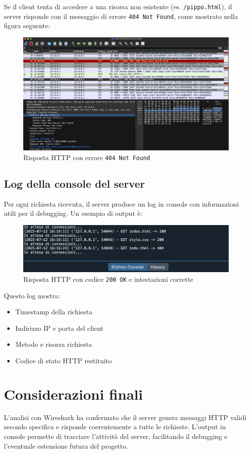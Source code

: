 \documentclass[a4paper,12pt]{report}
\begin{document}
Se il client tenta di accedere a una risorsa non esistente (es. \texttt{/pippo.html}), il server risponde con il messaggio di errore \texttt{404 Not Found}, come mostrato nella figura seguente:

\begin{figure}[H]
    \centering
    \includegraphics[width=1.0\textwidth]{Images/404NotFound.png}
    \caption{Risposta HTTP con errore \texttt{404 Not Found}}
\end{figure}

\section{Log della console del server}

Per ogni richiesta ricevuta, il server produce un log in console con informazioni utili per il debugging. Un esempio di output è:
\begin{figure}[H]
    \centering
    \includegraphics[width=1.0\textwidth]{Images/consoleLog.png}
    \caption{Risposta HTTP con codice \texttt{200 OK} e intestazioni corrette}
\end{figure}

Questo log mostra:
\begin{itemize}
    \item Timestamp della richiesta
    \item Indirizzo IP e porta del client
    \item Metodo e risorsa richiesta
    \item Codice di stato HTTP restituito
\end{itemize}

\chapter{Considerazioni finali }

L’analisi con Wireshark ha confermato che il server genera messaggi HTTP validi secondo specifica e risponde coerentemente a tutte le richieste. L’output in console permette di tracciare l’attività del server, facilitando il debugging e l’eventuale estensione futura del progetto.
\end{document}
